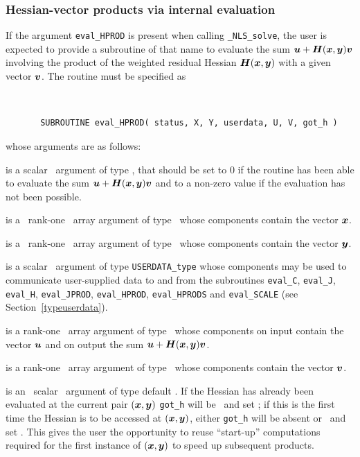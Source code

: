 \documentclass{galahad}
\newcommand{\packagename}{NLS}
\newcommand{\fullpackagename}{\libraryname\_\packagename}
\newcommand{\solver}{{\tt \fullpackagename\_solve}}
\begin{document}

\subsubsection{Hessian-vector products via internal evaluation\label{hvfv}}

If the argument {\tt eval\_HPROD} is present when calling \solver, the
user is expected to provide a subroutine of that name to evaluate the
sum ${\bm{u}} + {\bm{H}}({\bm{x}},{\bm{y}}) {\bm{v}}$ involving the
product of the weighted residual Hessian ${\bm{H}}({\bm{x}},{\bm{y}})$
with a given vector ${\bm{v}}$.
The routine must be specified as

\def\baselinestretch{0.8}
{\tt
\begin{verbatim}
       SUBROUTINE eval_HPROD( status, X, Y, userdata, U, V, got_h )
\end{verbatim} }
\def\baselinestretch{1.0}
\noindent whose arguments are as follows:

\begin{description}
 is a scalar \intentout\ argument of type \integer,
that should be set to 0 if the routine has been able to evaluate the
sum ${\bm{u}} + {\bm{H}}({\bm{x}},{\bm{y}}){\bm{v}}$
and to a non-zero value if the evaluation has not been possible.

 is a \ rank-one \intentin\ array argument of type
\realdp\ whose components contain the vector ${\bm{x}}$.

 is a \ rank-one \intentin\ array argument of type
\realdp\ whose components contain the vector ${\bm{y}}$.

 is a scalar \intentinout\ argument of type
{\tt USERDATA\_type} whose components may be used
to communicate user-supplied data to and from the subroutines
{\tt eval\_C}, {\tt eval\_J}, {\tt eval\_H}, {\tt eval\_JPROD},
{\tt eval\_HPROD}, {\tt eval\_HPRODS} and {\tt eval\_SCALE}
(see Section~\ref{typeuserdata}).

 is a rank-one \intentinout\ array argument of type \realdp\
whose components on input contain the vector ${\bm{u}}$ and on output the
sum ${\bm{u}} + {\bm{H}}({\bm{x}},{\bm{y}}) {\bm{v}}$.

 is a rank-one \intentin\ array argument of type \realdp\
whose components contain the vector ${\bm{v}}$.

 is an \optional\ scalar \intentin\ argument of type default
\logical. If the Hessian has already been evaluated at the current pair
$({\bm{x}},{\bm{y}})$
{\tt got\_h} will be \present\ and set \true; if this is the first time
the Hessian is to be accessed at $({\bm{x}},{\bm{y}})$, either {\tt got\_h} will
be absent or \present\ and set \false. This gives the user the opportunity
to reuse ``start-up'' computations required for the first instance of
$({\bm{x}},{\bm{y}})$ to speed up subsequent products.

\end{description}
\end{document}
